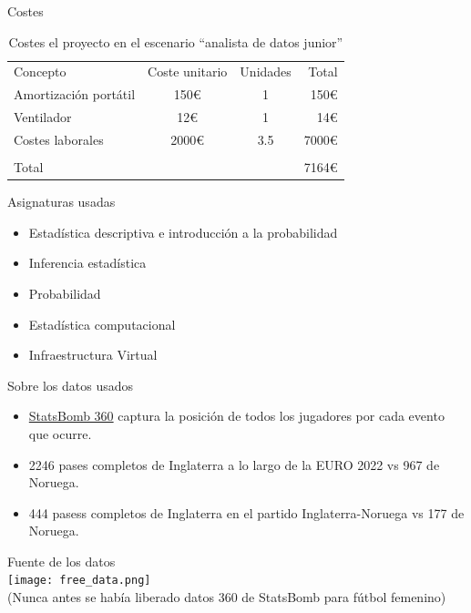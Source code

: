 \documentclass{beamer}
\begin{document}
\begin{frame}{Costes}
	\begin{table}
		\begin{tabular}[h!tbp]{lccr}
		  Concepto & Coste unitario & Unidades & Total \\
		  Amortización portátil & 150€ & 1 & 150€ \\
		  Ventilador            & 12€  & 1 & 14€ \\
		  Costes laborales      & 2000€& 3.5 & 7000€ \\
		  \hline \\
		  \multicolumn{3}{l}{Total} & 7164€ \\
		\end{tabular}
		\caption{Costes el proyecto en el escenario ``analista de datos junior''} \label{tab:costes2}
	\end{table}
\end{frame}

\begin{frame}{Asignaturas usadas}
	\begin{itemize}
		\item Estadística descriptiva e introducción a la probabilidad 
		\item Inferencia estadística 
		\item Probabilidad 
		\item Estadística computacional 
		\item Infraestructura Virtual
	\end{itemize}
\end{frame}

\begin{frame}{Sobre los datos usados}
	\begin{itemize}
		\item \href{https://statsbomb.com/articles/soccer/statsbomb-release-free-360-data-womens-euro-2022-available-now/}{StatsBomb 360}
		captura la posición de todos los jugadores por cada evento que ocurre.
		\item 2246 pases completos de Inglaterra a lo largo de la EURO 2022 vs 967 de Noruega.
		\item 444 pasess completos de Inglaterra en el partido Inglaterra-Noruega vs 177 de Noruega.
	\end{itemize}
	\begin{center}
		Fuente de los datos \\[12pt]
		\texttt{[image: free\_data.png]}
		\\
		\footnotesize(Nunca antes se había liberado datos 360 de StatsBomb para fútbol femenino)
    \end{center}
\end{frame}
\end{document}
